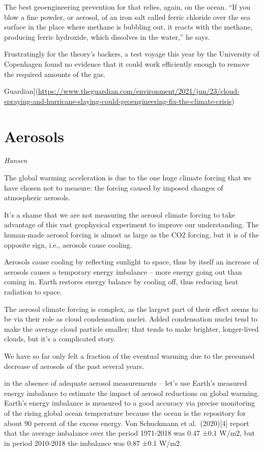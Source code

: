\documentclass[
]{book}
\begin{document}
The best geoengineering prevention for that relies, again, on the ocean. ``If you blow a fine powder, or aerosol, of an iron salt called ferric chloride over the sea surface in the place where methane is bubbling out, it reacts with the methane, producing ferric hydroxide, which dissolves in the water,'' he says.

Frustratingly for the theory's backers, a test voyage this year by the University of Copenhagen found no evidence that it could work efficiently enough to remove the required amounts of the gas.

Guardian{]}(\url{https://www.theguardian.com/environment/2021/jun/23/cloud-spraying-and-hurricane-slaying-could-geoengineering-fix-the-climate-crisis})

\hypertarget{aerosols}{%
\section{Aerosols}\label{aerosols}}

\emph{Hansen}

The global warming acceleration is due to the one huge climate forcing that we have chosen not to measure: the forcing caused by imposed changes of atmospheric aerosols.

It's a shame that we are not measuring the aerosol climate forcing to take advantage of this vast geophysical experiment to improve our understanding. The human-made aerosol forcing is almost as large as the CO2 forcing, but it is of the opposite sign, i.e., aerosols cause cooling.

Aerosols cause cooling by reflecting sunlight to space, thus by itself an increase of aerosols causes a temporary energy imbalance -- more energy going out than coming in. Earth restores energy balance by cooling off, thus reducing heat radiation to space.

The aerosol climate forcing is complex, as the largest part of their effect seems to be via their role as cloud condensation nuclei. Added condensation nuclei tend to make the average cloud particle smaller; that tends to make brighter, longer-lived clouds, but it's a complicated story.

We have so far only felt a fraction of the eventual warming due to the presumed decrease of aerosols of the past several years.

in the absence of adequate aerosol measurements -- let's use Earth's measured energy imbalance to estimate the impact of aerosol reductions on global warming. Earth's energy imbalance is measured to a good accuracy via precise monitoring of the rising global ocean temperature because the ocean is the repository for about 90 percent of the excess energy. Von Schuckmann et al.~(2020){[}4{]} report that the average imbalance over the period 1971-2018 was 0.47 ±0.1 W/m2, but in period 2010-2018 the imbalance was 0.87 ±0.1 W/m2.
\end{document}
